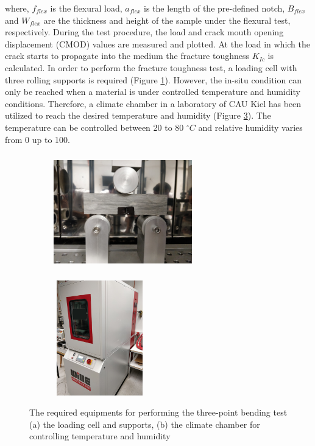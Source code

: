 where, $f_{flex}$ is the flexural load, $a_{flex}$ is the length of the pre-defined notch, $B_{flex}$ and $W_{flex}$ are the thickness and height of the sample under the flexural test, respectively. During the test procedure, the load and crack mouth opening displacement (CMOD) values are measured and plotted. At the load in which the crack starts to propagate into the medium the fracture toughness $K_{Ic}$ is calculated. In order to perform the fracture toughness test, a loading cell with three rolling supports is required (Figure \ref{fig:Amir_Fracture_Toughness_Setup_a}). However, the in-situ condition can only be reached when a material is under controlled temperature and humidity conditions. Therefore, a climate chamber in a laboratory of CAU Kiel has been utilized to reach the desired temperature and humidity (Figure \ref{fig:Amir_Fracture_Toughness_Setup_b}). The temperature can be controlled between 20 to 80 $^{\circ}C$ and relative humidity varies from 0 up to 100. 

\begin{figure}[!ht]
\centering
\begin{subfigure}[c]{0.5\textwidth}
\centering
\includegraphics[width=6cm,height=5cm]{figures/Amir_Fracture_Toughness_Setup_a.png}
\subcaption{}
\label{fig:Amir_Fracture_Toughness_Setup_a}
\end{subfigure}
\hfill
\begin{subfigure}[c]{0.48\textwidth}
\centering
\includegraphics[width=4cm,height=5cm]{figures/Amir_Fracture_Toughness_Setup_b.png}
\subcaption{}
\label{fig:Amir_Fracture_Toughness_Setup_b}
\end{subfigure}
\caption{The required equipments for performing the three-point bending test (a) the loading cell and supports, (b) the climate chamber for controlling temperature and humidity}
\end{figure}

